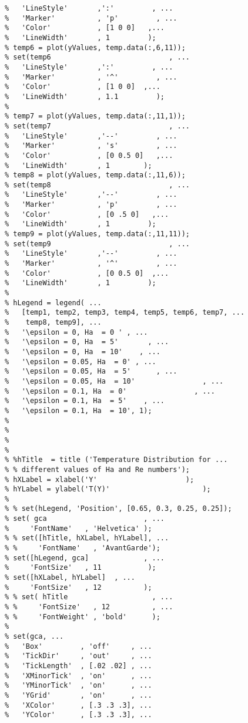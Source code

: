 \begin{lstlisting}
%   'LineStyle'       ,':'         , ...
%   'Marker'          , 'p'         , ...
%   'Color'           , [1 0 0]   ,...
%   'LineWidth'       , 1         );
% temp6 = plot(yValues, temp.data(:,6,11));
% set(temp6                            , ...
%   'LineStyle'       ,':'         , ...
%   'Marker'          , '^'         , ...
%   'Color'           , [1 0 0]  ,...
%   'LineWidth'       , 1.1         );
% 
% temp7 = plot(yValues, temp.data(:,11,1));
% set(temp7                            , ...
%   'LineStyle'       ,'--'         , ...
%   'Marker'          , 's'         , ...
%   'Color'           , [0 0.5 0]   ,...
%   'LineWidth'       , 1        );
% temp8 = plot(yValues, temp.data(:,11,6));
% set(temp8                            , ...
%   'LineStyle'       ,'--'         , ...
%   'Marker'          , 'p'         , ...
%   'Color'           , [0 .5 0]   ,...
%   'LineWidth'       , 1         );
% temp9 = plot(yValues, temp.data(:,11,11));
% set(temp9                            , ...
%   'LineStyle'       ,'--'         , ...
%   'Marker'          , '^'         , ...
%   'Color'           , [0 0.5 0]  ,...
%   'LineWidth'       , 1         );
% 
% hLegend = legend( ...
%   [temp1, temp2, temp3, temp4, temp5, temp6, temp7, ...
%    temp8, temp9], ...
%   '\epsilon = 0, Ha  = 0 ' , ...
%   '\epsilon = 0, Ha  = 5'       , ...
%   '\epsilon = 0, Ha  = 10'    , ...
%   '\epsilon = 0.05, Ha  = 0' , ...
%   '\epsilon = 0.05, Ha  = 5'      , ...
%   '\epsilon = 0.05, Ha  = 10'                , ...
%   '\epsilon = 0.1, Ha  = 0'                , ...
%   '\epsilon = 0.1, Ha  = 5'    , ...
%   '\epsilon = 0.1, Ha  = 10', 1);
% 
% 
% 
% 
% %hTitle  = title ('Temperature Distribution for ...
% % different values of Ha and Re numbers');
% hXLabel = xlabel('Y'                     );
% hYLabel = ylabel('T(Y)'                      );
% 
% % set(hLegend, 'Position', [0.65, 0.3, 0.25, 0.25]);
% set( gca                       , ...
%     'FontName'   , 'Helvetica' );
% % set([hTitle, hXLabel, hYLabel], ...
% %     'FontName'   , 'AvantGarde');
% set([hLegend, gca]             , ...
%     'FontSize'   , 11           );
% set([hXLabel, hYLabel]  , ...
%     'FontSize'   , 12          );
% % set( hTitle                    , ...
% %     'FontSize'   , 12          , ...
% %     'FontWeight' , 'bold'      );
% 
% set(gca, ...
%   'Box'         , 'off'     , ...
%   'TickDir'     , 'out'     , ...
%   'TickLength'  , [.02 .02] , ...
%   'XMinorTick'  , 'on'      , ...
%   'YMinorTick'  , 'on'      , ...
%   'YGrid'       , 'on'      , ...
%   'XColor'      , [.3 .3 .3], ...
%   'YColor'      , [.3 .3 .3], ...

\end{lstlisting}
